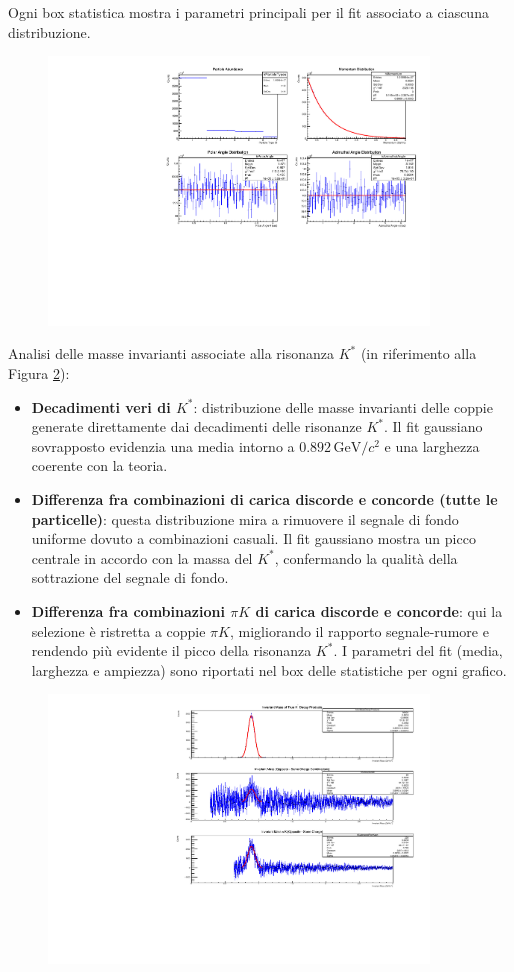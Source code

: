 \documentclass[a4paper,11pt]{article}
\begin{document}
Ogni box statistica mostra i parametri principali per il fit associato a ciascuna distribuzione.

\begin{figure}[h!]
    \centering
    \includegraphics[width=0.9\textwidth]{distributions.pdf}
    \caption{}
    \label{fig:distribuzioni}
\end{figure}

\clearpage

Analisi delle masse invarianti associate alla risonanza \( K^* \) (in riferimento alla Figura \ref{fig:kstar}):
\begin{itemize}
    \item \textbf{Decadimenti veri di \( K^* \)}: distribuzione delle masse invarianti delle coppie generate direttamente dai decadimenti delle risonanze \( K^* \). Il fit gaussiano sovrapposto evidenzia una media intorno a \( 0.892 \, \mathrm{GeV}/c^2 \) e una larghezza coerente con la teoria.
    \item \textbf{Differenza fra combinazioni di carica discorde e concorde (tutte le particelle)}: questa distribuzione mira a rimuovere il segnale di fondo uniforme dovuto a combinazioni casuali. Il fit gaussiano mostra un picco centrale in accordo con la massa del \( K^* \), confermando la qualità della sottrazione del segnale di fondo.
    \item \textbf{Differenza fra combinazioni \( \pi K \) di carica discorde e concorde}: qui la selezione è ristretta a coppie \( \pi K \), migliorando il rapporto segnale-rumore e rendendo più evidente il picco della risonanza \( K^* \). I parametri del fit (media, larghezza e ampiezza) sono riportati nel box delle statistiche per ogni grafico.
\end{itemize}

\begin{figure}[h!]
    \centering
    \includegraphics[width=0.9\textwidth]{invariant_mass_distributions.pdf}
    \caption{}
    \label{fig:kstar}
\end{figure}
\end{document}
